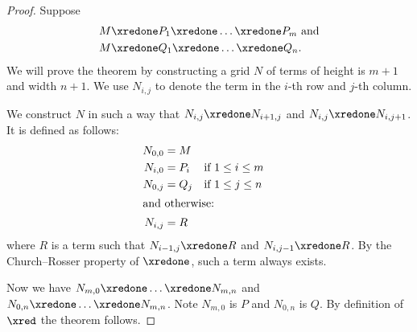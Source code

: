 \documentclass[../../../include/open-logic-section]{subfiles}
\begin{document}
\begin{proof}
  Suppose 
  \begin{align*}
    M & \xredone P_1 \xredone \dots \xredone P_m \text{ and}\\
    M & \xredone Q_1 \xredone \dots \xredone Q_n.
  \end{align*}
  We will prove the theorem by constructing a grid $N$ of terms of
  height is $m + 1$ and width $n + 1$. We use $N_{i,j}$ to denote the
  term in the $i$-th row and $j$-th column.
  
  We construct $N$ in such a way that $N_{i,j} \xredone N_{i+1,j}$ and
  $N_{i,j} \xredone N_{i,j+1}$. It is defined as follows:
  \begin{align*}
    N_{0,0} &= M \\
    N_{i,0} &= P_i && \text{if } 1 \le i \le m \\
    N_{0,j} &= Q_j && \text{if } 1 \le j \le n \\
  \intertext{and otherwise:}
    N_{i,j} &= R
  \end{align*}
  where $R$ is a term such that $N_{i-1,j} \xredone R$ and $N_{i,j-1}
  \xredone R$. By the Church--Rosser property of $\xredone$, such a
  term always exists.

  Now we have $N_{m,0} \xredone \dots \xredone N_{m,n}$ and $N_{0,n}
  \xredone \dots \xredone N_{m,n}$. Note $N_{m,0}$ is $P$ and $N_{0,n}$
  is $Q$. By definition of $\xred$ the theorem follows.
\end{proof}
\end{document}
